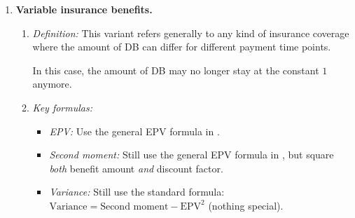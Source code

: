 \begin{enumerate}
\begin{enumerate}[label={(\arabic*)}]
\begin{itemize}
Example (\(n\)-year term life insurance):
\[
\Ax{}[(m)]{}_{\termxn}=\sum_{k=0}^{\rc{mn-1}}v^{\frac{k+1}{m}}\px[\frac{k}{m}]{x}\qx[\frac{1}{m}]{x+\frac{k}{m}}
=v^{\frac{1}{m}}\qx[\frac{1}{m}]{x}+v^{\frac{2}{m}}\px[\frac{1}{m}]{x}\qx[\frac{1}{m}]{x+\frac{1}{m}}
+\dotsb
+v^{n}\px[\frac{mn-1}{m}]{x}\qx[\frac{1}{m}]{x+\frac{mn-1}{m}}.
\]
\end{itemize}
\item \emph{Recursive formulas:} Again the recursive formulas can be obtained
by modifying the ones for discrete case in 
suitably. Let us use whole life insurance (\(\Ax{x}[(m)]\)) as an example:
\[
\Ax{x}[\mgc{(m)}]=\Ax{}[\mgc{(m)}]{}_{\termxn}+\Ex[n]{x}\Ax{x+n}[\mgc{(m)}]
\overset{(n=\mgc{\frac{1}{m}})}{=}v^{\mgc{\frac{1}{m}}}\qx[\mgc{\frac{1}{m}}]{x}+v^{\mgc{\frac{1}{m}}}\px[\mgc{\frac{1}{m}}]{x}\Ax{x+\mgc{\frac{1}{m}}}.
\]
\begin{center}
\end{center}
\end{enumerate}
\item \label{it:var-benefit-insurance} \textbf{Variable insurance benefits.}
\begin{enumerate}[label={(\arabic*)}]
\item \emph{Definition:} This variant refers generally to any kind of insurance
coverage where the amount of DB can differ for different payment time points.

\begin{note}
In this case, the amount of DB may no longer stay at the constant \(1\) anymore.
\end{note}
\item \emph{Key formulas:}
\begin{itemize}
\item \emph{EPV:} Use the general EPV formula in .
\item \emph{Second moment:} Still use the general EPV formula in
, but square \emph{both} benefit amount \emph{and}
discount factor.
\item \emph{Variance:} Still use the standard formula:
\(\text{Variance}=\text{Second moment}-\text{EPV}^{2}\) (nothing special).
\end{itemize}


\end{enumerate}
\end{enumerate}

